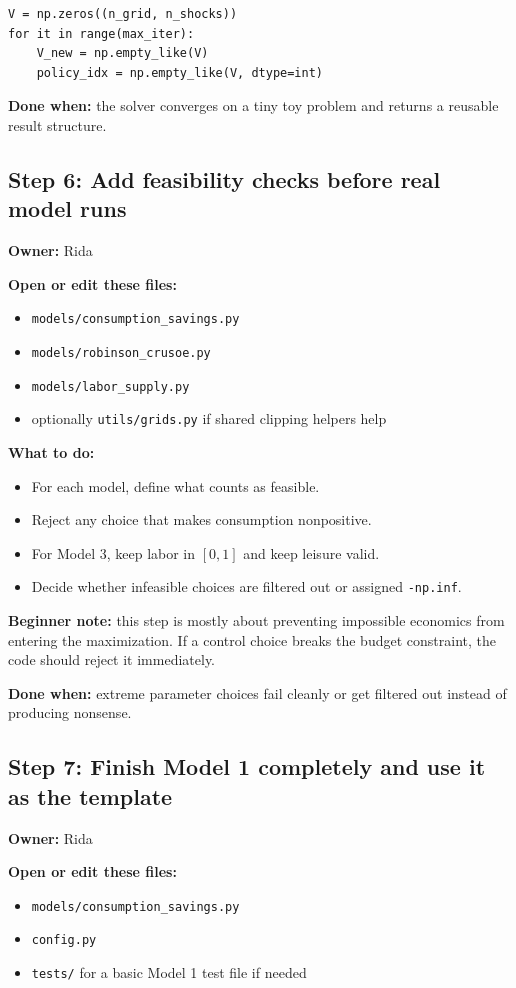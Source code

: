 \documentclass[11pt]{article}
\begin{document}
\begin{lstlisting}
V = np.zeros((n_grid, n_shocks))
for it in range(max_iter):
    V_new = np.empty_like(V)
    policy_idx = np.empty_like(V, dtype=int)
\end{lstlisting}

\textbf{Done when:} the solver converges on a tiny toy problem and returns a reusable result structure.

\subsection{Step 6: Add feasibility checks before real model runs}
\textbf{Owner:} Rida

\textbf{Open or edit these files:}
\begin{itemize}
    \item \texttt{models/consumption\_savings.py}
    \item \texttt{models/robinson\_crusoe.py}
    \item \texttt{models/labor\_supply.py}
    \item optionally \texttt{utils/grids.py} if shared clipping helpers help
\end{itemize}

\textbf{What to do:}
\begin{itemize}
    \item For each model, define what counts as feasible.
    \item Reject any choice that makes consumption nonpositive.
    \item For Model 3, keep labor in \([0,1]\) and keep leisure valid.
    \item Decide whether infeasible choices are filtered out or assigned \texttt{-np.inf}.
\end{itemize}

\textbf{Beginner note:} this step is mostly about preventing impossible economics from entering the maximization. If a control choice breaks the budget constraint, the code should reject it immediately.

\textbf{Done when:} extreme parameter choices fail cleanly or get filtered out instead of producing nonsense.

\subsection{Step 7: Finish Model 1 completely and use it as the template}
\textbf{Owner:} Rida

\textbf{Open or edit these files:}
\begin{itemize}
    \item \texttt{models/consumption\_savings.py}
    \item \texttt{config.py}
    \item \texttt{tests/} for a basic Model 1 test file if needed
\end{itemize}
\end{document}
